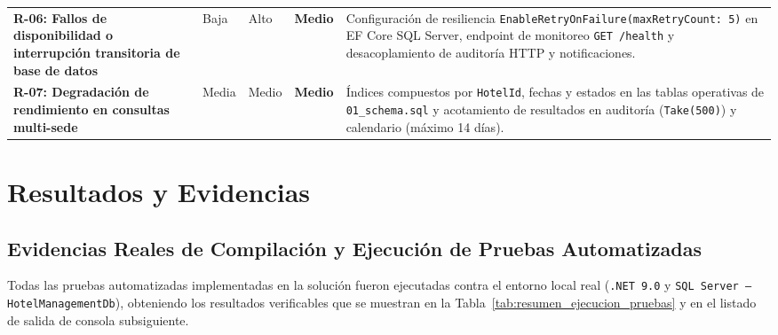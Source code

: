 \documentclass[12pt,a4paper]{article}
\begin{document}
\begin{longtable}{p{3.2cm} p{1.6cm} p{1.6cm} p{1.6cm} p{6.4cm}}
\textbf{R-06: Fallos de disponibilidad o interrupci\'on transitoria de base de datos} & Baja & Alto & \textbf{Medio} & Configuraci\'on de resiliencia \texttt{EnableRetryOnFailure(maxRetryCount: 5)} en EF Core SQL Server, endpoint de monitoreo \texttt{GET /health} y desacoplamiento de auditor\'ia HTTP y notificaciones.\\[0.15cm]
\textbf{R-07: Degradaci\'on de rendimiento en consultas multi-sede} & Media & Medio & \textbf{Medio} & \'Indices compuestos por \texttt{HotelId}, fechas y estados en las tablas operativas de \texttt{01\_schema.sql} y acotamiento de resultados en auditor\'ia (\texttt{Take(500)}) y calendario (m\'aximo 14 d\'ias).\\
\end{longtable}

\section{Resultados y Evidencias}

\subsection{Evidencias Reales de Compilaci\'on y Ejecuci\'on de Pruebas Automatizadas}
Todas las pruebas automatizadas implementadas en la soluci\'on fueron ejecutadas contra el entorno local real (\texttt{.NET 9.0} y \texttt{SQL Server --- HotelManagementDb}), obteniendo los resultados verificables que se muestran en la Tabla~\ref{tab:resumen_ejecucion_pruebas} y en el listado de salida de consola subsiguiente.
\end{document}
